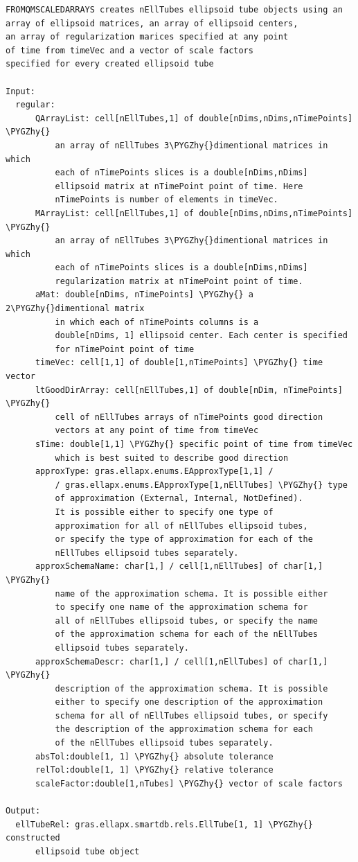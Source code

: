 \documentclass[letterpaper,10pt,english]{sphinxmanual}
\def\PYGZhy{\char`\-}
\begin{document}
\begin{Verbatim}[commandchars=\\\{\}]
FROMQMSCALEDARRAYS creates nEllTubes ellipsoid tube objects using an
array of ellipsoid matrices, an array of ellipsoid centers,
an array of regularization marices specified at any point
of time from timeVec and a vector of scale factors
specified for every created ellipsoid tube

Input:
  regular:
      QArrayList: cell[nEllTubes,1] of double[nDims,nDims,nTimePoints] \PYGZhy{}
          an array of nEllTubes 3\PYGZhy{}dimentional matrices in which
          each of nTimePoints slices is a double[nDims,nDims]
          ellipsoid matrix at nTimePoint point of time. Here
          nTimePoints is number of elements in timeVec.
      MArrayList: cell[nEllTubes,1] of double[nDims,nDims,nTimePoints] \PYGZhy{}
          an array of nEllTubes 3\PYGZhy{}dimentional matrices in which
          each of nTimePoints slices is a double[nDims,nDims]
          regularization matrix at nTimePoint point of time.
      aMat: double[nDims, nTimePoints] \PYGZhy{} a 2\PYGZhy{}dimentional matrix
          in which each of nTimePoints columns is a
          double[nDims, 1] ellipsoid center. Each center is specified
          for nTimePoint point of time
      timeVec: cell[1,1] of double[1,nTimePoints] \PYGZhy{} time vector
      ltGoodDirArray: cell[nEllTubes,1] of double[nDim, nTimePoints] \PYGZhy{}
          cell of nEllTubes arrays of nTimePoints good direction
          vectors at any point of time from timeVec
      sTime: double[1,1] \PYGZhy{} specific point of time from timeVec
          which is best suited to describe good direction
      approxType: gras.ellapx.enums.EApproxType[1,1] /
          / gras.ellapx.enums.EApproxType[1,nEllTubes] \PYGZhy{} type
          of approximation (External, Internal, NotDefined).
          It is possible either to specify one type of
          approximation for all of nEllTubes ellipsoid tubes,
          or specify the type of approximation for each of the
          nEllTubes ellipsoid tubes separately.
      approxSchemaName: char[1,] / cell[1,nEllTubes] of char[1,] \PYGZhy{}
          name of the approximation schema. It is possible either
          to specify one name of the approximation schema for
          all of nEllTubes ellipsoid tubes, or specify the name
          of the approximation schema for each of the nEllTubes
          ellipsoid tubes separately.
      approxSchemaDescr: char[1,] / cell[1,nEllTubes] of char[1,] \PYGZhy{}
          description of the approximation schema. It is possible
          either to specify one description of the approximation
          schema for all of nEllTubes ellipsoid tubes, or specify
          the description of the approximation schema for each
          of the nEllTubes ellipsoid tubes separately.
      absTol:double[1, 1] \PYGZhy{} absolute tolerance
      relTol:double[1, 1] \PYGZhy{} relative tolerance
      scaleFactor:double[1,nTubes] \PYGZhy{} vector of scale factors

Output:
  ellTubeRel: gras.ellapx.smartdb.rels.EllTube[1, 1] \PYGZhy{} constructed
      ellipsoid tube object
\end{Verbatim}
\end{document}
